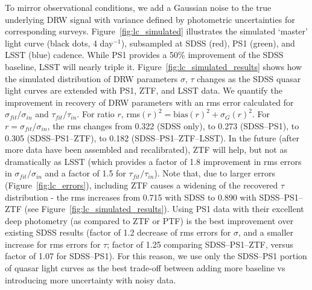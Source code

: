 \documentclass[twocolumn]{aastex62}
\newcommand{\project}[1]{\textsf{#1}}
\begin{document}
To mirror observational conditions, we add a Gaussian noise to the true underlying DRW signal with variance defined by photometric uncertainties for corresponding surveys. Figure~\ref{fig:lc_simulated} illustrates the simulated `master' light curve (black dots, 4 day$^{-1}$), subsampled at SDSS (red), PS1 (green), and LSST (blue) cadence. While PS1 provides a 50\% improvement of the SDSS baseline, LSST will nearly triple it. Figure~\ref{fig:lc_simulated_results} shows how the simulated distribution of DRW parameters $\sigma$, $\tau$ changes as the SDSS quasar light curves are extended with PS1, ZTF, and LSST data. We quantify the improvement in recovery of DRW parameters with an rms error calculated for $\sigma_{fit}/\sigma_{in}$ and $\tau_{fit} / \tau_{in}$. For ratio $r$,  rms$(r)^{2} = \mathrm{bias}(r)^{2} + \sigma_{G}(r)^{2}$. For $r=\sigma_{fit}/\sigma_{in}$, the rms changes from 0.322 (SDSS only), to 0.273  (SDSS--PS1), to 0.305 (SDSS--PS1--ZTF), to 0.182 (SDSS--PS1--ZTF--LSST). In the future (after more data have been assembled and recalibrated), ZTF will help, but not as dramatically as LSST (which provides a factor of 1.8 improvement in rms errors in $\sigma_{fit}/\sigma_{in}$ and a factor of 1.5 for $\tau_{fit} / \tau_{in}$). Note that, due to larger errors (Figure~\ref{fig:lc_errors}), including ZTF causes a widening of the recovered $\tau$ distribution - the rms increases from 0.715 with SDSS to 0.890 with SDSS--PS1--ZTF (see Figure~\ref{fig:lc_simulated_results}). Using PS1 data with their excellent  deep photometry (as compared to ZTF or PTF) is the best improvement over existing SDSS results (factor of 1.2 decrease of rms errors for $\sigma$, and a smaller increase for rms errors for $\tau$; factor of 1.25 comparing SDSS--PS1--ZTF, versus factor of 1.07 for SDSS--PS1). For this reason, we use only the SDSS--PS1 portion of quasar light curves as the best trade-off between adding more baseline vs introducing more uncertainty with noisy data.

\begin{figure*} 
	\caption{Ratio of DRW parameters fitted with \project{celerite}: $\tau$ and $\sigma$, to the input $\tau_{in} = 575 $d, $\sigma_{in} = 0.2 / \sqrt{2} {\sim} 0.14$  (SF$_{\infty}=0.2$ mag). We simulated 9258 `master' light curves, subsampled at real SDSS or PS1 $r$-band cadence and photometric uncertainties, and simulated ZTF and LSST cadence. To simulate observing conditions, the underlying DRW signal was convolved with a Gaussian noise corresponding to epochal errors. For each light curve, we start with the SDSS segment only, and as we add more segments (PS1, ZTF, LSST), we refit for DRW model parameters with \project{celerite}. Thus,	each distribution corresponds to a different segment of the simulated  combined SDSS--PS1--ZTF--LSST light curves. Extending the baseline shifts the distribution of the recovered DRW parameters toward the unbiased regime; the vertical dashed line marks the input matching the output. This corresponds to the top right (well-constrained) portion of Figure~\ref{fig:rho_space}.}
	\label{fig:lc_simulated_results}
\end{figure*} 
\end{document}
